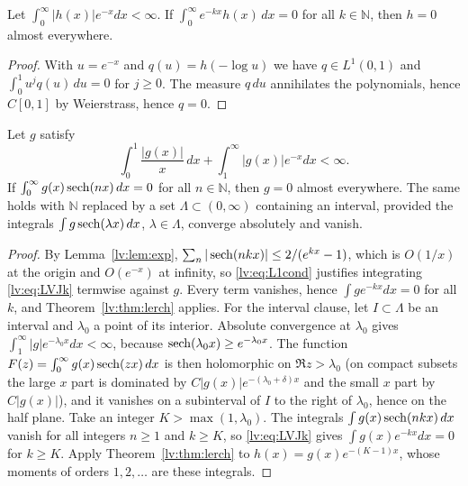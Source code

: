 \begin{theorem}[Lerch]\label{lv:thm:lerch}
Let $\int_0^\infty|h(x)|e^{-x}dx<\infty$. If $\int_0^\infty e^{-kx}h(x)\,dx=0$ for all $k\in\mathbb N$, then $h=0$ almost everywhere.
\end{theorem}

\begin{proof}
With $u=e^{-x}$ and $q(u)=h(-\log u)$ we have $q\in L^1(0,1)$ and $\int_0^1u^jq(u)\,du=0$ for $j\ge0$. The measure $q\,du$ annihilates the polynomials, hence $C[0,1]$ by Weierstrass, hence $q=0$.
\end{proof}

\begin{theorem}[completeness in $L^1$]\label{lv:thm:L1}
Let $g$ satisfy
\begin{equation}\label{lv:eq:L1cond}
\int_0^1\frac{|g(x)|}x\,dx+\int_1^\infty|g(x)|e^{-x}dx<\infty .
\end{equation}
If $\int_0^\infty g(x)\operatorname{sech}(nx)\,dx=0$ for all $n\in\mathbb N$, then $g=0$ almost everywhere. The same holds with $\mathbb N$ replaced by a set $\Lambda\subset(0,\infty)$ containing an interval, provided the integrals $\int g\operatorname{sech}(\lambda x)\,dx$, $\lambda\in\Lambda$, converge absolutely and vanish.
\end{theorem}

\begin{proof}
By Lemma~\ref{lv:lem:exp}, $\sum_n|\operatorname{sech}(nkx)|\le2/(e^{kx}-1)$, which is $O(1/x)$ at the origin and $O(e^{-x})$ at infinity, so \eqref{lv:eq:L1cond} justifies integrating \eqref{lv:eq:LVJk} termwise against $g$. Every term vanishes, hence $\int ge^{-kx}dx=0$ for all $k$, and Theorem~\ref{lv:thm:lerch} applies. For the interval clause, let $I\subset\Lambda$ be an interval and $\lambda_0$ a point of its interior. Absolute convergence at $\lambda_0$ gives $\int_1^\infty|g|e^{-\lambda_0x}dx<\infty$, because $\operatorname{sech}(\lambda_0x)\ge e^{-\lambda_0x}$. The function $F(z)=\int_0^\infty g(x)\operatorname{sech}(zx)\,dx$ is then holomorphic on $\Re z>\lambda_0$ (on compact subsets the large $x$ part is dominated by $C|g(x)|e^{-(\lambda_0+\delta)x}$ and the small $x$ part by $C|g(x)|$), and it vanishes on a subinterval of $I$ to the right of $\lambda_0$, hence on the half plane. Take an integer $K>\max(1,\lambda_0)$. The integrals $\int g(x)\operatorname{sech}(nkx)\,dx$ vanish for all integers $n\ge1$ and $k\ge K$, so \eqref{lv:eq:LVJk} gives $\int g(x)e^{-kx}dx=0$ for $k\ge K$. Apply Theorem~\ref{lv:thm:lerch} to $h(x)=g(x)e^{-(K-1)x}$, whose moments of orders $1,2,\dots$ are these integrals.
\end{proof}

